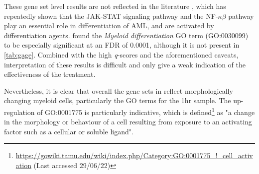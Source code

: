 These gene set level results are not reflected in the literature \citep{matikainen1997retinoic, gianni1997stat1, cohen2005jak, ren2013resveratrol, iwata2016parp9}, which has repeatedly shown that the JAK-STAT signaling pathway and the NF-$\kappa\beta$ pathway play an essential role in differentiation of \ac{AML}, and are activated by differentiation agents. \cite{gatt2021tyrosol} found the \textit{Myeloid differentiation} \ac{GO} term (\ac{GO}:0030099) to be especially significant at an \ac{FDR} of 0.0001, although it is not present in \autoref{tab:gage}. Combined with the high \textit{q}-scores and the aforementioned caveats, interpretation of these results is difficult and only give a weak indication of the effectiveness of the treatment. 

Nevertheless, it is clear that overall the gene sets in \cite{tab:gage} reflect morphologically changing myeloid cells, particularly the \ac{GO} terms for the 1hr sample. The up-regulation of GO:0001775 is particularly indicative, which is defined\footnote{\url{https://gowiki.tamu.edu/wiki/index.php/Category:GO:0001775_!_cell_activation} (Last accessed 29/06/22)} as "a change in the morphology or behaviour of a cell resulting from exposure to an activating factor such as a cellular or soluble ligand".


